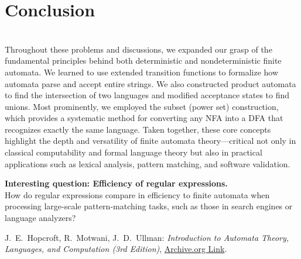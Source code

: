 \documentclass{article}
\theoremstyle{theorem}
\theoremstyle{definition}
\theoremstyle{remark}
\begin{document}
\section{Conclusion} \\
Throughout these problems and discussions, we expanded our grasp of the fundamental principles behind both deterministic and nondeterministic finite automata. We learned to use extended transition functions to formalize how automata parse and accept entire strings. We also constructed product automata to find the intersection of two languages and modified acceptance states to find unions. Most prominently, we employed the subset (power set) construction, which provides a systematic method for converting any NFA into a DFA that recognizes exactly the same language. Taken together, these core concepts highlight the depth and versatility of finite automata theory—critical not only in classical computability and formal language theory but also in practical applications such as lexical analysis, pattern matching, and software validation.

\textbf{ Interesting question: Efficiency of regular expressions.}\\
How do regular expressions compare in efficiency to finite automata when processing large-scale pattern-matching tasks, such as those in search engines or language analyzers?
\newpage

\begin{thebibliography}{99}

    \bibitem[HMU] 
    J.~E.~Hopcroft, R.~Motwani, J.~D.~Ullman: 
    \emph{Introduction to Automata Theory, Languages, and Computation (3rd Edition)}, 
    \href{https://archive.org/details/hopcroft-motwani-ullman-introduction-to-automata-theory-languages-and-computations-3rd-edition/page/65/mode/1up?view=theater}{Archive.org Link}.
    
\end{thebibliography}    
\end{document}
